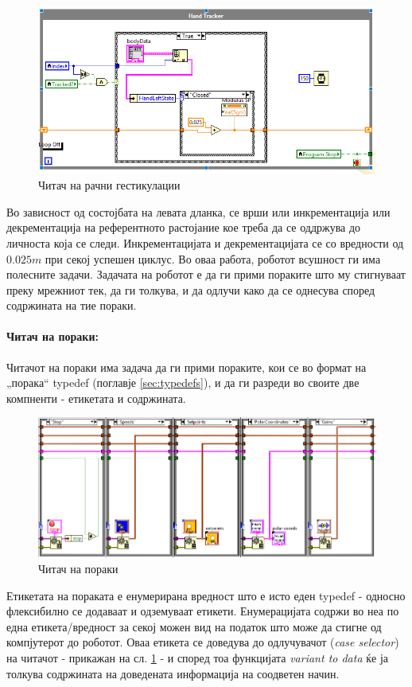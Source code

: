\documentclass[12pt]{article}
\begin{document}
      \begin{figure}[H]
        \centering
        \includegraphics[width=0.85\linewidth]{./images/hand_control.png}
        \caption{Читач на рачни гестикулации}
        \end{figure}

      Во зависност од состојбата на левата дланка, се врши или инкрементација или декрементација на референтното растојание кое треба да се оддржува до личноста која се следи. Инкрементацијата и декрементацијата се со вредности од $0.025m$ при секој успешен циклус.
    \bigbreak
    Во оваа работа, роботот всушност ги има полесните задачи. Задачата на роботот е да ги прими пораките што му стигнуваат преку мрежниот тек, да ги толкува, и да одлучи како да се однесува според содржината на тие пораки.

    \paragraph{Читач на пораки:\\}
    Читачот на пораки има задача да ги прими пораките, кои се во формат на „порака“ typedef (поглавје \ref{sec:typedefs}), и да ги разреди во своите две компненти - етикетата и содржината.
      \begin{figure}[H]
        \centering
        \includegraphics[width=0.85\linewidth]{./images/robot_msg.png}
        \caption{Читач на пораки}
        \label{fig:parser}
        \end{figure}
    Етикетата на пораката е енумерирана вредност што е исто еден typedef - односно флексибилно се додаваат и одземуваат етикети. Енумерацијата содржи во неа по една етикета/вредност за секој можен вид на податок што може да стигне од компјутерот до роботот. Оваа етикета се доведува до одлучувачот (\textit{case selector}) на читачот - прикажан на сл. \ref{fig:parser} - и според тоа функцијата \textit{variant to data} ќе ја толкува содржината на доведената информација на соодветен начин.
\newpage
\end{document}
